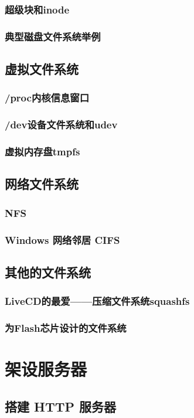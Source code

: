 \documentclass[amstex,twoside]{ctexbook}
\begin{document}
\subsection{ 超级块和inode}
\subsection{  典型磁盘文件系统举例}
\section{  虚拟文件系统	}
\subsection{  /proc内核信息窗口}
\subsection{  /dev设备文件系统和udev}
\subsection{  虚拟内存盘tmpfs}
\section{  网络文件系统	}
\subsection{  NFS	}
\subsection{  Windows 网络邻居 CIFS	}
\section{  其他的文件系统	}
\subsection{  LiveCD的最爱——压缩文件系统squashfs}
\subsection{  为Flash芯片设计的文件系统}

\chapter{架设服务器}
\section{  搭建 HTTP 服务器}
\end{document}
